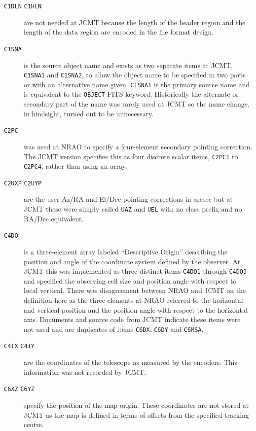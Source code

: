 \documentclass[final,authoryear,5p,times,twocolumn]{elsarticle}
\begin{document}
\begin{description}

\item[\texttt{C1DLN} \texttt{C1HLN}] are not needed at JCMT
  because the length of the header region and the length of the data
  region are encoded in the file format design.

\item[\texttt{C1SNA}] is the source object name and exists as two separate
  items at JCMT, \texttt{C1SNA1} and \texttt{C1SNA2}, to allow the
  object name to be specified in two parts or with an alternative name
  given. \texttt{C1SNA1} is the primary source name and is equivalent
  to the \texttt{OBJECT} FITS keyword. Historically the alternate or
  secondary part of the name was rarely used at JCMT so the name
  change, in hindsight, turned out to be unnecessary.

\item[\texttt{C2PC}] was used at NRAO to specify a four-element
  secondary pointing correction. The JCMT version specifies this as
  four discrete scalar items, \texttt{C2PC1} to \texttt{C2PC4}, rather
  than using an array.

\item[\texttt{C2UXP} \texttt{C2UYP}] are the user Az/RA and El/Dec
  pointing corrections in arcsec but at JCMT these were simply called
  \texttt{UAZ} and \texttt{UEL} with no class prefix and no RA/Dec
  equivalent.

\item[\texttt{C4DO}] is a three-element array labeled ``Descriptive
  Origin'' describing the position and angle of the coordinate system
  defined by the observer. At JCMT this was implemented as three
  distinct items \texttt{C4DO1} through \texttt{C4DO3} and specified
  the observing cell size and position angle with respect to local
  vertical. There was disagreement between NRAO and JCMT on the
  definition here as the three elements at NRAO referred to the
  horizontal and vertical position and the position angle with respect
  to the horizontal axis. Documents and source code from JCMT indicate
  these items were not used and are duplicates of items \texttt{C6DX},
  \texttt{C6DY} and \texttt{C6MSA}.

\item[\texttt{C4IX} \texttt{C4IY}] are the coordinates of the
  telescope as measured by the encoders. This information was not
  recorded by JCMT.

\item[\texttt{C6XZ} \texttt{C6YZ}] specify the position of the map
  origin. These coordinates are not stored at JCMT as the map is
  defined in terms of offsets from the specified tracking centre.


\end{description}
\end{document}

